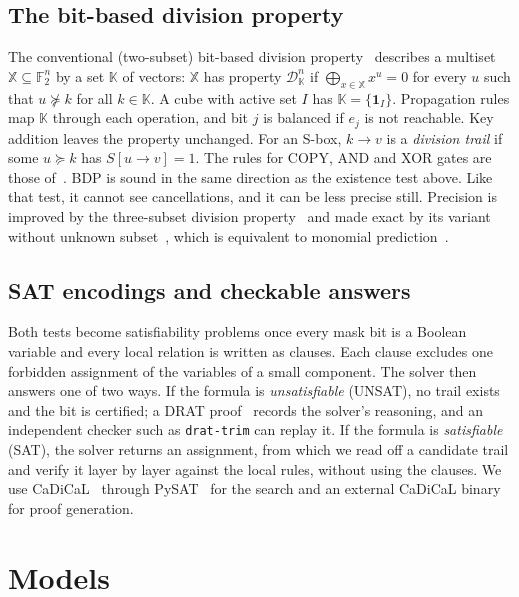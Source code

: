 \documentclass[pdflatex,sn-mathphys-num]{sn-jnl}
\theoremstyle{thmstyleone}
\theoremstyle{thmstylethree}
\theoremstyle{thmstyletwo}
\newcommand{\Ftwo}{\mathbb{F}_2}
\begin{document}
\subsection{The bit-based division property}
The conventional (two-subset) bit-based division property~\cite{todo2016bit} describes a multiset $\mathbb X\subseteq\Ftwo^n$ by a set $\mathbb K$ of vectors: $\mathbb X$ has property $\mathcal D^n_{\mathbb K}$ if $\bigoplus_{x\in\mathbb X}x^u=0$ for every $u$ such that $u\not\succeq k$ for all $k\in\mathbb K$. A cube with active set $I$ has $\mathbb K=\{\mathbf 1_I\}$. Propagation rules map $\mathbb K$ through each operation, and bit $j$ is balanced if $e_j$ is not reachable. Key addition leaves the property unchanged. For an S-box, $k\to v$ is a \emph{division trail} if some $u\succeq k$ has $S[u\to v]=1$. The rules for COPY, AND and XOR gates are those of~\cite{todo2016bit,xiang2016milp}. BDP is sound in the same direction as the existence test above. Like that test, it cannot see cancellations, and it can be less precise still. Precision is improved by the three-subset division property~\cite{huwang2019} and made exact by its variant without unknown subset~\cite{hao2020}, which is equivalent to monomial prediction~\cite{hu2020mp}.

\subsection{SAT encodings and checkable answers}
Both tests become satisfiability problems once every mask bit is a Boolean variable and every local relation is written as clauses. Each clause excludes one forbidden assignment of the variables of a small component. The solver then answers one of two ways. If the formula is \emph{unsatisfiable} (UNSAT), no trail exists and the bit is certified; a DRAT proof~\cite{drattrim2014} records the solver's reasoning, and an independent checker such as \texttt{drat-trim} can replay it. If the formula is \emph{satisfiable} (SAT), the solver returns an assignment, from which we read off a candidate trail and verify it layer by layer against the local rules, without using the clauses. We use CaDiCaL~\cite{cadical2020,cadical2024} through PySAT~\cite{pysat2018} for the search and an external CaDiCaL binary for proof generation.

\section{Models}\label{sec:models}
\end{document}
